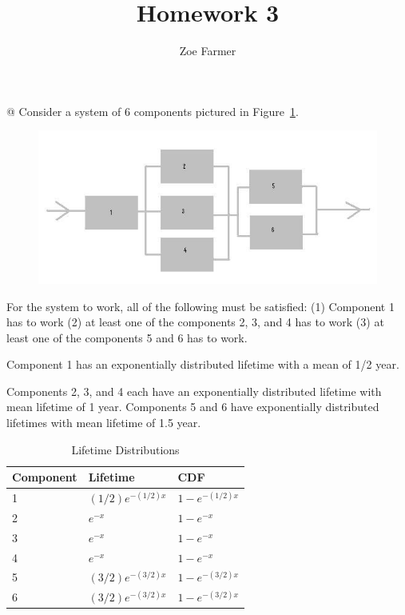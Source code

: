 \documentclass[10pt]{article}
\title{Homework 3}
\author{Zoe Farmer}
\begin{document}
\maketitle

\begin{easylist}[enumerate]
    @ Consider a system of 6 components pictured in Figure~\ref{fig:arrow}.\newline

    \begin{figure}[!ht]
        \centering
        \includegraphics[scale=0.5]{./img/diagram31.png}
        \caption{}
        \label{fig:arrow}
    \end{figure}

    For the system to work, all of the following must be
    satisfied: (1) Component 1 has to work (2) at least one of the components 2, 3, and 4 has to work (3) at least one
    of the components 5 and 6 has to work.\newline

    Component 1 has an exponentially distributed lifetime with a mean of 1/2 year.\newline

    Components 2, 3, and 4 each have an exponentially distributed lifetime with mean lifetime of 1 year. Components 5
    and 6 have exponentially distributed lifetimes with mean lifetime of 1.5 year.

    \begin{table}[!ht]
        \centering
        \begin{tabular}{|l|l|l|}
            \hline
            Component & Lifetime & CDF\\
            \hline
            1 & $(1/2)e^{-(1/2)x}$ & $1 - e^{-(1/2)x}$\\
            \hline
            2 & $e^{-x}$ & $1 - e^{-x}$\\
            \hline
            3 & $e^{-x}$ & $1 - e^{-x}$\\
            \hline
            4 & $e^{-x}$ & $1 - e^{-x}$\\
            \hline
            5 & $(3/2)e^{-(3/2)x}$ & $1 - e^{-(3/2)x}$\\
            \hline
            6 & $(3/2)e^{-(3/2)x}$ & $1 - e^{-(3/2)x}$\\
            \hline
        \end{tabular}
        \caption{Lifetime Distributions}
        \label{table:lifetimes}
    \end{table}


\end{easylist}
\end{document}
